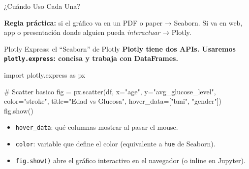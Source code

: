 \documentclass[aspectratio=169, 11pt]{beamer}
\begin{document}
\begin{frame}{¿Cuándo Uso Cada Una?}
  \vspace{8pt}
  \begin{tcolorbox}[colback=arcaGray, colframe=arcaRed, boxrule=0.5pt, arc=2pt,
    left=6pt, right=6pt, top=4pt, bottom=4pt]
    {\scriptsize\color{arcaDark}
    \faQuestionCircle\hspace{4pt}\textbf{Regla práctica:} si el gráfico va
    en un PDF o paper → Seaborn. Si va en web, app o presentación donde
    alguien pueda \textit{interactuar} → Plotly.}
  \end{tcolorbox}
\end{frame}

\begin{frame}[fragile,shrink=10]{Plotly Express: el ``Seaborn'' de Plotly}
  \vspace{-4pt}
  {\footnotesize\color{arcaDark}\bfseries
    Plotly tiene dos APIs. Usaremos \texttt{plotly.express}: concisa y
    trabaja con DataFrames.}

  \vspace{4pt}
  \begin{pyblock}
import plotly.express as px

# Scatter basico
fig = px.scatter(df, x="age", y="avg_glucose_level",
                 color="stroke",
                 title="Edad vs Glucosa",
                 hover_data=["bmi", "gender"])
fig.show()
  \end{pyblock}

  \vspace{4pt}
  {\scriptsize\color{textMuted}
  \begin{itemize}\setlength{\itemsep}{3pt}
    \item[{\color{arcaRed}\scriptsize\faArrowRight}]
      \texttt{hover\_data}: qué columnas mostrar al pasar el mouse.
    \item[{\color{arcaRed}\scriptsize\faArrowRight}]
      \texttt{color}: variable que define el color (equivalente a \texttt{hue}
      de Seaborn).
    \item[{\color{arcaRed}\scriptsize\faArrowRight}]
      \texttt{fig.show()} abre el gráfico interactivo en el navegador
      (o inline en Jupyter).
  \end{itemize}
  }
\end{frame}
\end{document}
